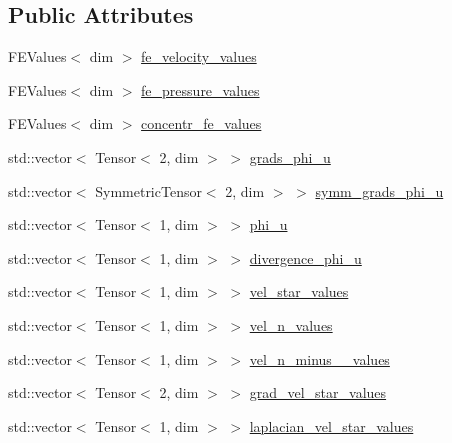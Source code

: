 \subsection*{Public Attributes}
\begin{DoxyCompactItemize}
\item 
F\+E\+Values$<$ dim $>$ \hyperlink{struct_assembly_1_1_scratch_1_1diffusion__step_abc801170e70dc1174e7570a16a9c9cef}{fe\+\_\+velocity\+\_\+values}
\item 
F\+E\+Values$<$ dim $>$ \hyperlink{struct_assembly_1_1_scratch_1_1diffusion__step_a8ae6347dd8bec8156be7f56235d7a10f}{fe\+\_\+pressure\+\_\+values}
\item 
F\+E\+Values$<$ dim $>$ \hyperlink{struct_assembly_1_1_scratch_1_1diffusion__step_a419a532515fcf72c1eaad266fb6fe9c8}{concentr\+\_\+fe\+\_\+values}
\item 
std\+::vector$<$ Tensor$<$ 2, dim $>$ $>$ \hyperlink{struct_assembly_1_1_scratch_1_1diffusion__step_a8d840d813840efeef8363b9630714e6d}{grads\+\_\+phi\+\_\+u}
\item 
std\+::vector$<$ Symmetric\+Tensor$<$ 2, dim $>$ $>$ \hyperlink{struct_assembly_1_1_scratch_1_1diffusion__step_a5f7d1700139f21792a1107ede3903cf5}{symm\+\_\+grads\+\_\+phi\+\_\+u}
\item 
std\+::vector$<$ Tensor$<$ 1, dim $>$ $>$ \hyperlink{struct_assembly_1_1_scratch_1_1diffusion__step_a7aeba7bef458d2c451ec2ca3d0ddbd0f}{phi\+\_\+u}
\item 
std\+::vector$<$ Tensor$<$ 1, dim $>$ $>$ \hyperlink{struct_assembly_1_1_scratch_1_1diffusion__step_a78dbb9aa70e10f4e3400a7ea8df0395f}{divergence\+\_\+phi\+\_\+u}
\item 
std\+::vector$<$ Tensor$<$ 1, dim $>$ $>$ \hyperlink{struct_assembly_1_1_scratch_1_1diffusion__step_a94cf958bf7072a08e34291f3b50f2a51}{vel\+\_\+star\+\_\+values}
\item 
std\+::vector$<$ Tensor$<$ 1, dim $>$ $>$ \hyperlink{struct_assembly_1_1_scratch_1_1diffusion__step_a3c69fd1c796447267c5e60b4574b7cd6}{vel\+\_\+n\+\_\+values}
\item 
std\+::vector$<$ Tensor$<$ 1, dim $>$ $>$ \hyperlink{struct_assembly_1_1_scratch_1_1diffusion__step_a9fdda6a8d4c418b53bd1e9c6e03ffc26}{vel\+\_\+n\+\_\+minus\+\_\+\_\+values}
\item 
std\+::vector$<$ Tensor$<$ 2, dim $>$ $>$ \hyperlink{struct_assembly_1_1_scratch_1_1diffusion__step_a63260a19549621cb2c9c737a0a43e3f5}{grad\+\_\+vel\+\_\+star\+\_\+values}
\item 
std\+::vector$<$ Tensor$<$ 1, dim $>$ $>$ \hyperlink{struct_assembly_1_1_scratch_1_1diffusion__step_af7bfee637fae1cadfde75192f16c0684}{laplacian\+\_\+vel\+\_\+star\+\_\+values}

\end{DoxyCompactItemize}
